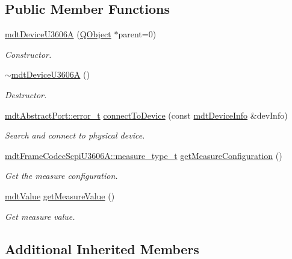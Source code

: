 \subsection*{Public Member Functions}
\begin{DoxyCompactItemize}
\item 
\hyperlink{classmdt_device_u3606_a_a91201ae14df7b553a947b5857eaa1c65}{mdt\-Device\-U3606\-A} (\hyperlink{class_q_object}{Q\-Object} $\ast$parent=0)
\begin{DoxyCompactList}\small\item\em Constructor. \end{DoxyCompactList}\item 
\hyperlink{classmdt_device_u3606_a_a7d2fb26475e72cce95ca6be384d569b7}{$\sim$mdt\-Device\-U3606\-A} ()
\begin{DoxyCompactList}\small\item\em Destructor. \end{DoxyCompactList}\item 
\hyperlink{classmdt_abstract_port_ad4121bb930c95887e77f8bafa065a85e}{mdt\-Abstract\-Port\-::error\-\_\-t} \hyperlink{classmdt_device_u3606_a_acf3b48b13bc179ad4f94b3011b7d607a}{connect\-To\-Device} (const \hyperlink{classmdt_device_info}{mdt\-Device\-Info} \&dev\-Info)
\begin{DoxyCompactList}\small\item\em Search and connect to physical device. \end{DoxyCompactList}\item 
\hyperlink{classmdt_frame_codec_scpi_u3606_a_a3d7a1de14d77797a08e3d2991fa9f004}{mdt\-Frame\-Codec\-Scpi\-U3606\-A\-::measure\-\_\-type\-\_\-t} \hyperlink{classmdt_device_u3606_a_a8732ec3f4a04a191585191e1ba4f190d}{get\-Measure\-Configuration} ()
\begin{DoxyCompactList}\small\item\em Get the measure configuration. \end{DoxyCompactList}\item 
\hyperlink{classmdt_value}{mdt\-Value} \hyperlink{classmdt_device_u3606_a_ae75a1a896f905487d080761a2b8cf5a5}{get\-Measure\-Value} ()
\begin{DoxyCompactList}\small\item\em Get measure value. \end{DoxyCompactList}\end{DoxyCompactItemize}
\subsection*{Additional Inherited Members}



